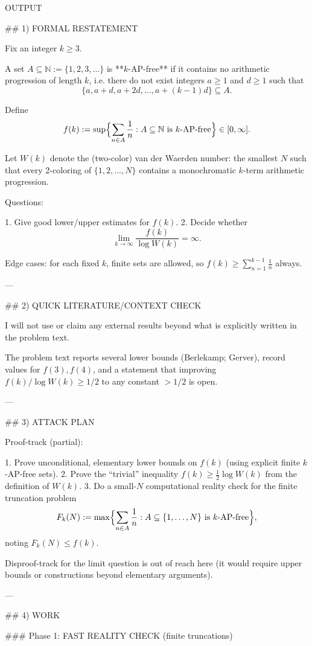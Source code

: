 OUTPUT

## 1) FORMAL RESTATEMENT

Fix an integer $k\ge 3$.

A set $A\subseteq\mathbb N:=\{1,2,3,\dots\}$ is **$k$-AP-free** if it contains no arithmetic progression of length $k$, i.e. there do not exist integers $a\ge 1$ and $d\ge 1$ such that
\[
\{a,a+d,a+2d,\dots,a+(k-1)d\}\subseteq A.
\]

Define
\[
f(k):=\sup\Bigl\{\sum_{n\in A}\frac{1}{n}: A\subseteq\mathbb N\text{ is $k$-AP-free}\Bigr\}\in[0,\infty].
\]

Let $W(k)$ denote the (two-color) van der Waerden number: the smallest $N$ such that every 2-coloring of $\{1,2,\dots,N\}$ contains a monochromatic $k$-term arithmetic progression.

Questions:

1. Give good lower/upper estimates for $f(k)$.
2. Decide whether
\[
\lim_{k\to\infty} \frac{f(k)}{\log W(k)} = \infty.
\]

Edge cases: for each fixed $k$, finite sets are allowed, so $f(k)\ge \sum_{n=1}^{k-1} \frac1n$ always.

---

## 2) QUICK LITERATURE/CONTEXT CHECK

I will not use or claim any external results beyond what is explicitly written in the problem text.

The problem text reports several lower bounds (Berlekamp; Gerver), record values for $f(3),f(4)$, and a statement that improving $f(k)/\log W(k)\ge 1/2$ to any constant $>1/2$ is open.

---

## 3) ATTACK PLAN

Proof-track (partial):

1. Prove unconditional, elementary lower bounds on $f(k)$ (using explicit finite $k$-AP-free sets).
2. Prove the “trivial” inequality $f(k)\ge \tfrac12\log W(k)$ from the definition of $W(k)$.
3. Do a small-$N$ computational reality check for the finite truncation problem
\[
F_k(N):=\max\Bigl\{\sum_{n\in A}\frac1n: A\subseteq\{1,\dots,N\}\text{ is $k$-AP-free}\Bigr\},
\]
noting $F_k(N)\le f(k)$.

Disproof-track for the limit question is out of reach here (it would require upper bounds or constructions beyond elementary arguments).

---

## 4) WORK

### Phase 1: FAST REALITY CHECK (finite truncations)

